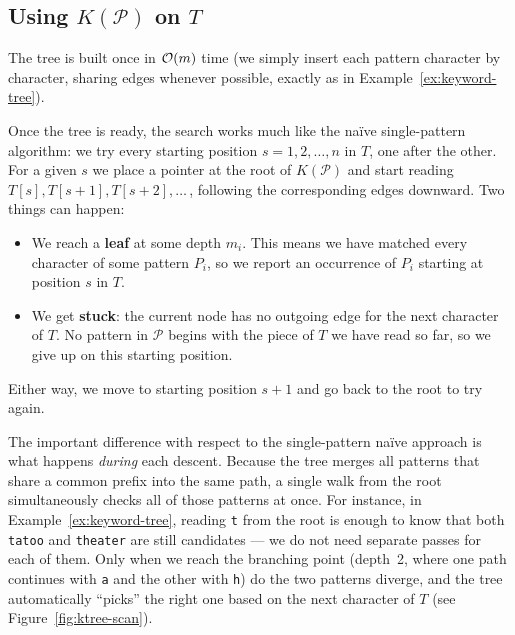 \subsection{Using $K(\mathcal{P})$ on $T$}

The tree is built once in $\mathcal{O}\!\left(m\right)$ time (we simply insert each pattern
character by character, sharing edges whenever possible, exactly as in
Example~\ref{ex:keyword-tree}).

Once the tree is ready, the search works much like the naïve
single-pattern algorithm: we try every starting position
$s = 1, 2, \ldots, n$ in $T$, one after the other.
For a given $s$ we place a pointer at the root of $K(\mathcal{P})$ and
start reading $T[s], T[s{+}1], T[s{+}2], \ldots$\,, following the
corresponding edges downward.
Two things can happen:
\begin{itemize}[leftmargin=1.6em, itemsep=2pt]
  \item We reach a \textbf{leaf} at some depth $m_i$.
        This means we have matched every character of some pattern $P_i$,
        so we report an occurrence of $P_i$ starting at position $s$ in $T$.
  \item We get \textbf{stuck}: the current node has no outgoing edge for the
        next character of $T$.
        No pattern in $\mathcal{P}$ begins with the piece of $T$ we have
        read so far, so we give up on this starting position.
\end{itemize}
Either way, we move to starting position $s{+}1$ and go back to the root
to try again.

The important difference with respect to the single-pattern naïve approach
is what happens \emph{during} each descent.
Because the tree merges all patterns that share a common prefix into the
same path, a single walk from the root simultaneously checks all of those
patterns at once.
For instance, in Example~\ref{ex:keyword-tree}, reading \texttt{t} from
the root is enough to know that both \texttt{tatoo} and \texttt{theater}
are still candidates --- we do not need separate passes for each of them.
Only when we reach the branching point (depth~2, where one path continues
with \texttt{a} and the other with \texttt{h}) do the two patterns
diverge, and the tree automatically ``picks'' the right one based on
the next character of $T$ (see Figure~\ref{fig:ktree-scan}).

